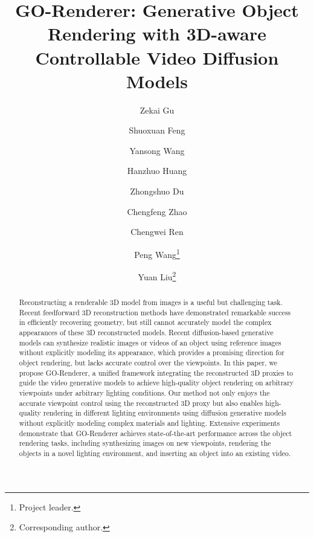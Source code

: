 \documentclass[runningheads]{llncs}
\newcommand{\methodname}{GO-Renderer\xspace}
\begin{document}
\title{GO-Renderer: Generative Object Rendering with 3D-aware Controllable Video Diffusion Models}


\author{
    Zekai Gu \and
    Shuoxuan Feng \and
    Yansong Wang \and
    Hanzhuo Huang \and
    Zhongshuo Du \and
    Chengfeng Zhao \and
    Chengwei Ren \and
    Peng Wang\thanks{Project leader.} \and
    Yuan Liu\thanks{Corresponding author.}
}



\maketitle


\begin{abstract} 
Reconstructing a renderable 3D model from images is a useful but challenging task.
Recent feedforward 3D reconstruction methods have demonstrated remarkable success in efficiently recovering geometry, but still cannot accurately model the complex appearances of these 3D reconstructed models. 
Recent diffusion-based generative models can synthesize realistic images or videos of an object using reference images without explicitly modeling its appearance, which provides a promising direction for object rendering, but lacks accurate control over the viewpoints.
In this paper, we propose \methodname, a unified framework integrating the reconstructed 3D proxies to guide the video generative models to achieve high-quality object rendering on arbitrary viewpoints under arbitrary lighting conditions. 
Our method not only enjoys the accurate viewpoint control using the reconstructed 3D proxy but also enables high-quality rendering in different lighting environments using diffusion generative models without explicitly modeling complex materials and lighting.
Extensive experiments demonstrate that \methodname achieves state-of-the-art performance across the object rendering tasks, including synthesizing images on new viewpoints, rendering the objects in a novel lighting environment, and inserting an object into an existing video. 

\vspace{-5mm}
\end{abstract}
\end{document}
